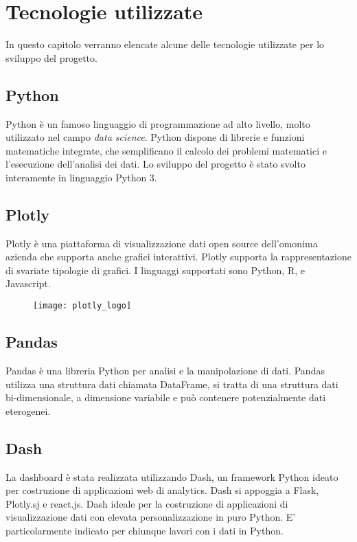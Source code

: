 \setlength{\parskip}{1em}

\section{Tecnologie utilizzate}

In questo capitolo verranno elencate alcune delle tecnologie utilizzate per lo sviluppo del progetto.

\subsection{Python}
Python è un famoso linguaggio di programmazione ad alto livello, molto utilizzato nel campo \emph{data science}.
Python dispone di librerie e funzioni matematiche integrate, che semplificano il calcolo dei problemi matematici e l'esecuzione dell'analisi dei dati.
Lo sviluppo del progetto è stato svolto interamente in linguaggio Python 3.


\subsection{Plotly}

Plotly è una piattaforma di visualizzazione dati open source dell’omonima azienda che supporta anche grafici interattivi.
Plotly supporta la rappresentazione di svariate tipologie di grafici.
I linguaggi supportati sono Python, R, e Javascript.
\begin{figure}[htp]
    \centering
    \texttt{[image: plotly\_logo]}
\end{figure}

\subsection{Pandas}
Pandas è una libreria Python per analisi e la manipolazione di dati.
Pandas utilizza una struttura dati chiamata DataFrame, si tratta di una struttura dati bi-dimensionale, a dimensione variabile e può contenere potenzialmente dati eterogenei.

\subsection{Dash}
La dashboard è stata realizzata utilizzando Dash, un framework Python ideato per costruzione di applicazioni web di analytics.
\noindent Dash si appoggia a Flask, Plotly.sj e react.js. Dash ideale per la costruzione di applicazioni di visualizzazione dati con elevata personalizzazione in puro Python. E’ particolarmente indicato per chiunque lavori con i dati in Python.

